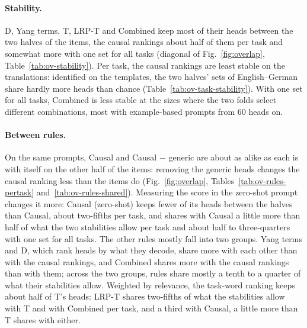 \documentclass[10pt,a4paper]{article}
\begin{document}
\paragraph{Stability.} D, Yang terms, T, LRP-T and Combined keep most of their heads between the two halves of the items, the causal rankings about half of them per task and somewhat more with one set for all tasks (diagonal of Fig.~\ref{fig:overlap}, Table~\ref{tab:ov-stability}). Per task, the causal rankings are least stable on the translations: identified on the templates, the two halves' sets of English--German share hardly more heads than chance (Table~\ref{tab:ov-task-stability}). With one set for all tasks, Combined is less stable at the sizes where the two folds select different combinations, most with example-based prompts from 60 heads on.

\paragraph{Between rules.} On the same prompts, Causal and Causal $-$ generic are about as alike as each is with itself on the other half of the items: removing the generic heads changes the causal ranking less than the items do (Fig.~\ref{fig:overlap}, Tables~\ref{tab:ov-rules-pertask} and~\ref{tab:ov-rules-shared}). Measuring the score in the zero-shot prompt changes it more: Causal (zero-shot) keeps fewer of its heads between the halves than Causal, about two-fifths per task, and shares with Causal a little more than half of what the two stabilities allow per task and about half to three-quarters with one set for all tasks. The other rules mostly fall into two groups. Yang terms and D, which rank heads by what they decode, share more with each other than with the causal rankings, and Combined shares more with the causal rankings than with them; across the two groups, rules share mostly a tenth to a quarter of what their stabilities allow. Weighted by relevance, the task-word ranking keeps about half of T's heads: LRP-T shares two-fifths of what the stabilities allow with T and with Combined per task, and a third with Causal, a little more than T shares with either.
\end{document}
